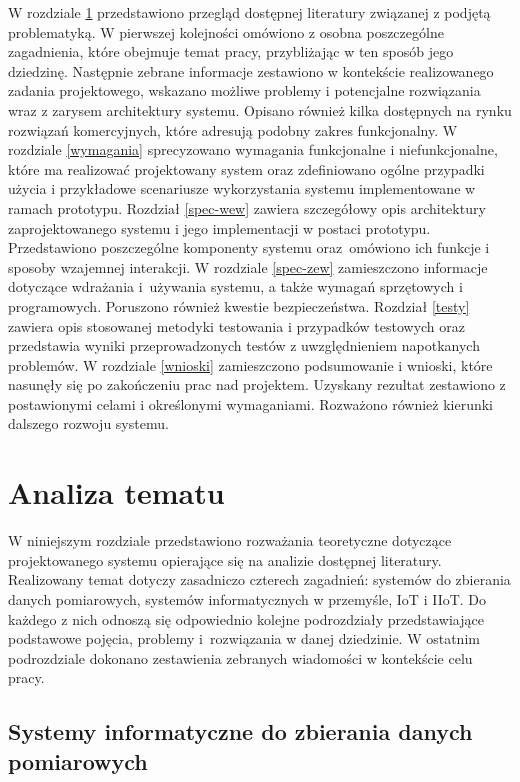 \documentclass[a4paper, 12pt, twoside]{article}
\begin{document}
W rozdziale \ref{analiza} przedstawiono przegląd dostępnej literatury związanej z podjętą problematyką.
W pierwszej kolejności omówiono z osobna poszczególne zagadnienia, które
obejmuje temat pracy, przybliżając w ten sposób jego dziedzinę.
Następnie zebrane informacje zestawiono w kontekście realizowanego zadania projektowego,
wskazano możliwe problemy i potencjalne rozwiązania wraz z zarysem architektury
systemu. Opisano również kilka dostępnych na rynku rozwiązań komercyjnych,
które adresują podobny zakres funkcjonalny. W rozdziale \ref{wymagania} sprecyzowano
wymagania funkcjonalne i niefunkcjonalne, które ma realizować projektowany system
oraz zdefiniowano ogólne przypadki użycia i przykładowe scenariusze wykorzystania systemu
implementowane w ramach prototypu. Rozdział \ref{spec-wew} zawiera
szczegółowy opis architektury zaprojektowanego systemu i jego implementacji
w postaci prototypu. Przedstawiono poszczególne
komponenty systemu oraz~omówiono ich funkcje i sposoby wzajemnej interakcji. 
W rozdziale \ref{spec-zew} zamieszczono informacje dotyczące
wdrażania i~używania systemu, a także wymagań sprzętowych i programowych.
Poruszono również kwestie bezpieczeństwa. Rozdział \ref{testy} zawiera
opis stosowanej metodyki testowania i przypadków testowych oraz przedstawia wyniki przeprowadzonych
testów z uwzględnieniem napotkanych problemów. W rozdziale \ref{wnioski} zamieszczono
podsumowanie i wnioski, które nasunęły się po zakończeniu prac nad projektem.
Uzyskany rezultat zestawiono z postawionymi celami i określonymi wymaganiami.
Rozważono również kierunki dalszego rozwoju systemu.

\newpage
\section{Analiza tematu}\label{analiza}

W niniejszym rozdziale przedstawiono rozważania teoretyczne dotyczące projektowanego
systemu opierające się na analizie dostępnej literatury. Realizowany temat
dotyczy zasadniczo czterech zagadnień: systemów do zbierania danych pomiarowych,
systemów informatycznych w przemyśle, IoT i IIoT.  Do każdego z nich odnoszą się
odpowiednio kolejne podrozdziały przedstawiające podstawowe pojęcia, problemy i~rozwiązania
w danej dziedzinie.
W ostatnim podrozdziale dokonano zestawienia zebranych wiadomości w kontekście
celu pracy.

\subsection{Systemy informatyczne do zbierania danych pomiarowych} \label{system-do-zbierania-danych}
\end{document}
